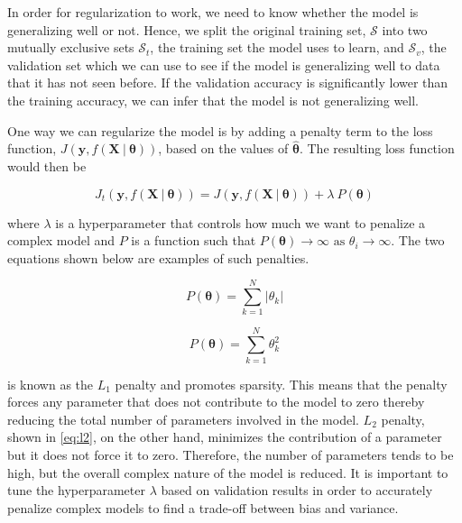 In order for regularization to work, we need to know whether the model is generalizing well or not. Hence, we split the original training set, $\mathcal{S}$ into two mutually exclusive sets $\mathcal{S}_t$, the training set the model uses to learn, and $\mathcal{S}_v$, the validation set which we can use to see if the model is generalizing well to data that it has not seen before. If the validation accuracy is significantly lower than the training accuracy, we can infer that the model is not generalizing well.

One way we can regularize the model is by adding a penalty term to the loss function, $J(\mathbf{y}, f(\mathbf{X} \ | \ \boldsymbol{\theta}))$, based on the values of $\boldsymbol{\hat{\theta}}$. The resulting loss function would then be

\begin{equation}
	J_{t}(\mathbf{y}, f(\mathbf{X} \ | \ \boldsymbol{\theta})) = J(\mathbf{y}, f(\mathbf{X} \ | \ \boldsymbol{\theta})) + \lambda \ P(\boldsymbol{\theta})
\end{equation}

\noindent
where $\lambda$ is a hyperparameter that controls how much we want to penalize a complex model and $P$ is a function such that $P(\boldsymbol{\theta}) \rightarrow \infty \text{ as } \theta_i \rightarrow \infty$. The two equations shown below are examples of such penalties. 


\begin{equation}
	\label{eq:l1}
	P(\boldsymbol{\boldsymbol{\theta}}) = \sum_{k = 1}^{N}{|\theta_k|}
\end{equation}

\begin{equation}
	\label{eq:l2}
	P(\boldsymbol{\theta}) = \sum_{k = 1}^{N}{\theta_k^2}
\end{equation}


 is known as the $L_1$ penalty and promotes sparsity. This means that the penalty forces any parameter that does not contribute to the model to zero thereby reducing the total number of parameters involved in the model. $L_2$ penalty, shown in \cref{eq:l2}, on the other hand, minimizes the contribution of a parameter but it does not force it to zero. Therefore, the number of parameters tends to be high, but the overall complex nature of the model is reduced. It is important to tune the hyperparameter $\lambda$ based on validation results in order to accurately penalize complex models to find a trade-off between bias and variance. 

